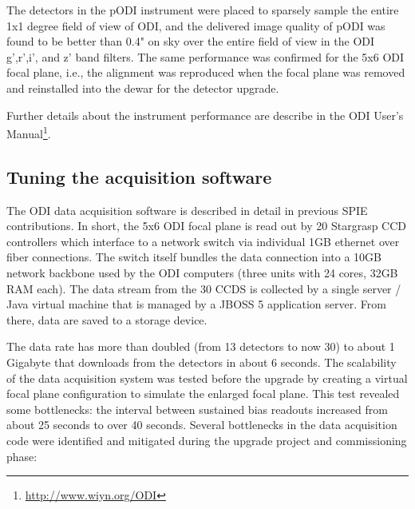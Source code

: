 \documentclass[]{spieman}
\begin{document}
The detectors in the pODI instrument were placed to sparsely sample the entire
1x1 degree field of view of ODI, and the delivered image quality of pODI was
found to be better than 0.4" on sky over the entire field of view in the ODI
g',r',i', and z' band filters. The same performance was confirmed for the 5x6
ODI focal plane, i.e., the alignment was reproduced when the focal plane was
removed and reinstalled into the dewar for the detector upgrade.

Further details about the instrument performance are describe in the ODI User's
Manual\footnote{\url{http://www.wiyn.org/ODI}}.


\subsection{Tuning the acquisition software}

The ODI data acquisition software is described in detail in previous SPIE
contributions\cite{Yeatts2008,Yeatts2010}. In short, the 5x6 ODI focal plane is
read out by 20 Stargrasp CCD controllers which interface to a network switch via
individual  1GB ethernet over fiber connections. The switch itself bundles the
data connection into a 10GB network backbone used by the ODI computers (three
units with 24 cores, 32GB RAM each). The data stream from the 30 CCDS is
collected by a single server / Java virtual machine that is managed by a JBOSS 5
application server. From there, data are saved to a storage device.

The data rate has more than doubled (from 13 detectors to now 30) to about 1
Gigabyte that downloads from the detectors in about 6 seconds.  The scalability
of the data acquisition system was tested before the upgrade by creating a
virtual focal plane  configuration to simulate the enlarged focal plane. This
test revealed some bottlenecks: the interval between sustained bias readouts
increased from about 25 seconds to over 40 seconds. Several bottlenecks in the
data acquisition code were identified and mitigated during the upgrade project
and commissioning phase:
\end{document}
